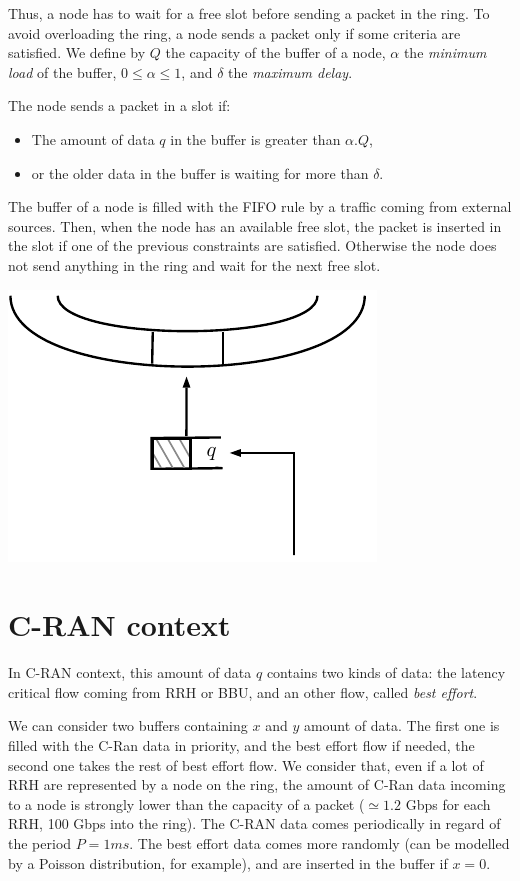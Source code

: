 \documentclass[a4paper,10pt]{article}
\begin{document}
Thus, a node has to wait for a free slot before sending a packet in the ring. To avoid overloading the ring, a node sends a packet only if some criteria  are satisfied.
We define by $Q$ the capacity of the buffer of a node, $\alpha$ the {\em minimum load} of the buffer, $0 \leq  \alpha \leq 1$, and $\delta$ the {\em maximum delay}.

The node sends a packet in a slot if:
\begin{itemize}
 \item The amount of data $q$ in the buffer is greater than $\alpha . Q$,
 \item or the older data in the buffer is waiting for more than $\delta$.
\end{itemize}

The buffer of a node is filled with the FIFO rule by a traffic coming from external sources. Then, when the node has an available free slot, the packet is inserted in the slot if one of the previous constraints are satisfied. Otherwise the node does not send anything in the ring and wait for the next free slot.

\begin{center}   

      \includegraphics[scale=0.7]{insertion0.pdf}

  
\end{center}

\section{C-RAN context}

In C-RAN context, this amount of data $q$ contains two kinds of data: the latency critical flow coming from RRH or BBU, and an other flow, called {\em best effort}.

We can consider two buffers containing $x$ and $y$ amount of data. The first one is filled with the C-Ran data in priority, and the best effort flow if needed, the second one takes the rest of best effort flow. We consider that, even if a lot of RRH are represented by a node on the ring, the amount of C-Ran data incoming to a node is strongly lower than the capacity of a packet ($\simeq 1.2$ Gbps for each RRH, 100 Gbps into the ring).
The C-RAN data comes periodically in regard of the period $P = 1ms$. 
The best effort data comes more randomly (can be modelled by a Poisson distribution, for example), and are inserted in the buffer if $x = 0$.
\end{document}
